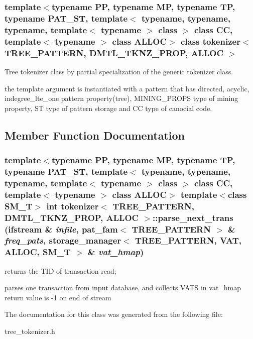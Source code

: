 \subsubsection*{template$<$typename PP, typename MP, typename TP, typename PAT\_\-ST, template$<$ typename, typename, typename, template$<$ typename $>$ class $>$ class CC, template$<$ typename $>$ class ALLOC$>$ class tokenizer$<$ TREE\_\-PATTERN, DMTL\_\-TKNZ\_\-PROP, ALLOC $>$}

Tree tokenizer class by partial specialization of the generic tokenizer class. 

the template argument is instantiated with a pattern that has directed, acyclic, indegree\_\-lte\_\-one pattern property(tree), MINING\_\-PROPS type of mining property, ST type of pattern storage and CC type of canocial code. 



\subsection{Member Function Documentation}
\subsubsection{\setlength{\rightskip}{0pt plus 5cm}template$<$typename PP, typename MP, typename TP, typename PAT\_\-ST, template$<$ typename, typename, typename, template$<$ typename $>$ class $>$ class CC, template$<$ typename $>$ class ALLOC$>$ template$<$class SM\_\-T$>$ int \bf{tokenizer}$<$ TREE\_\-PATTERN, DMTL\_\-TKNZ\_\-PROP, ALLOC $>$::parse\_\-next\_\-trans (ifstream \& {\em infile}, \bf{pat\_\-fam}$<$ TREE\_\-PATTERN $>$ \& {\em freq\_\-pats}, \bf{storage\_\-manager}$<$ TREE\_\-PATTERN, \bf{VAT}, ALLOC, SM\_\-T $>$ \& {\em vat\_\-hmap})\hspace{0.3cm}{\tt  [inline]}}\label{classtokenizer_3_01TREE__PATTERN_00_01DMTL__TKNZ__PROP_00_01ALLOC_01_4_308c934284dafab3e033ad9eab1f4dc5}


returns the TID of transaction read;

parses one transaction from input database, and collects VATS in vat\_\-hmap return value is -1 on end of stream 

The documentation for this class was generated from the following file:\begin{CompactItemize}
\item 
tree\_\-tokenizer.h\end{CompactItemize}
